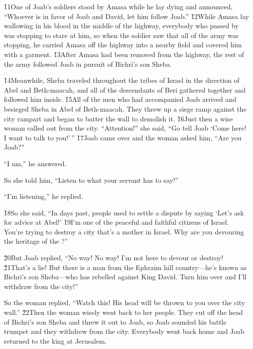 \v{11}One of Joab's soldiers stood by Amasa while he lay dying and announced, ``Whoever is in favor of Joab and David, let him follow Joab.'' \v{12}While Amasa lay wallowing in his blood in the middle of the highway, everybody who passed by was stopping to stare at him, so when the soldier saw that all of the army was stopping, he carried Amasa off the highway into a nearby field and covered him with a garment. \v{13}After Amasa had been removed from the highway, the rest of the army followed Joab in pursuit of Bichri's son Sheba.

\v{14}Meanwhile, Sheba traveled throughout the tribes of Israel in the direction of Abel and Beth-maacah, and all of the descendants of Beri gathered together and followed him inside. \v{15}All of the men who had accompanied Joab arrived and besieged Sheba in Abel of Beth-maacah. They threw up a siege ramp against the city rampart and began to batter the wall to demolish it. \v{16}Just then a wise woman called out from the city. ``Attention!'' she said, ``Go tell Joab `Come here! I want to talk to you!'\,'' \v{17}Joab came over and the woman asked him, ``Are you Joab?''

``I am,'' he answered.

So she told him, ``Listen to what your servant has to say!''

``I'm listening,'' he replied.

\v{18}So she said, ``In days past, people used to settle a dispute by saying `Let's ask for advice at Abel!' \v{19}I'm one of the peaceful and faithful citizens of Israel. You're trying to destroy a city that's a mother in Israel. Why are you devouring the heritage of the ?''

\v{20}But Joab replied, ``No way! No way! I'm not here to devour or destroy! \v{21}That's a lie! But there is a man from the Ephraim hill country---he's known as Bichri's son Sheba---who has rebelled against King David. Turn him over and I'll withdraw from the city!''

So the woman replied, ``Watch this! His head will be thrown to you over the city wall.'' \v{22}Then the woman wisely went back to her people. They cut off the head of Bichri's son Sheba and threw it out to Joab, so Joab sounded his battle trumpet and they withdrew from the city. Everybody went back home and Joab returned to the king at Jerusalem.

